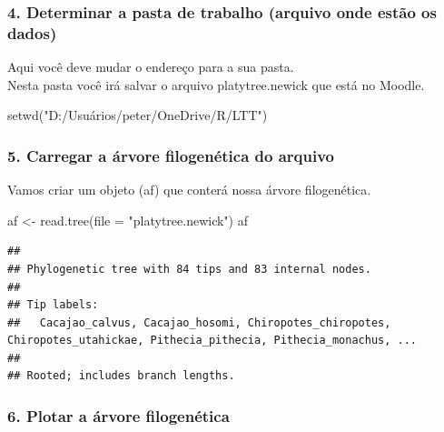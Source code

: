 \documentclass[
]{article}
\newenvironment{Shaded}{\begin{snugshade}}{\end{snugshade}}
\newcommand{\AttributeTok}[1]{\textcolor[rgb]{0.77,0.63,0.00}{#1}}
\newcommand{\FunctionTok}[1]{\textcolor[rgb]{0.00,0.00,0.00}{#1}}
\newcommand{\NormalTok}[1]{#1}
\newcommand{\OtherTok}[1]{\textcolor[rgb]{0.56,0.35,0.01}{#1}}
\newcommand{\StringTok}[1]{\textcolor[rgb]{0.31,0.60,0.02}{#1}}
\begin{document}
\hypertarget{determinar-a-pasta-de-trabalho-arquivo-onde-estuxe3o-os-dados}{%
\subsubsection{4. Determinar a pasta de trabalho (arquivo onde estão os
dados)}\label{determinar-a-pasta-de-trabalho-arquivo-onde-estuxe3o-os-dados}}

Aqui você deve mudar o endereço para a sua pasta.\\
Nesta pasta você irá salvar o arquivo platytree.newick que está no
Moodle.

\begin{Shaded}
\begin{Highlighting}[]
\FunctionTok{setwd}\NormalTok{(}\StringTok{"D:/Usuários/peter/OneDrive/R/LTT"}\NormalTok{)}
\end{Highlighting}
\end{Shaded}

\hypertarget{carregar-a-uxe1rvore-filogenuxe9tica-do-arquivo}{%
\subsubsection{5. Carregar a árvore filogenética do
arquivo}\label{carregar-a-uxe1rvore-filogenuxe9tica-do-arquivo}}

Vamos criar um objeto (af) que conterá nossa árvore filogenética.

\begin{Shaded}
\begin{Highlighting}[]
\NormalTok{af }\OtherTok{\textless{}{-}} \FunctionTok{read.tree}\NormalTok{(}\AttributeTok{file =} \StringTok{"platytree.newick"}\NormalTok{)}
\NormalTok{af}
\end{Highlighting}
\end{Shaded}

\begin{verbatim}
## 
## Phylogenetic tree with 84 tips and 83 internal nodes.
## 
## Tip labels:
##   Cacajao_calvus, Cacajao_hosomi, Chiropotes_chiropotes, Chiropotes_utahickae, Pithecia_pithecia, Pithecia_monachus, ...
## 
## Rooted; includes branch lengths.
\end{verbatim}

\hypertarget{plotar-a-uxe1rvore-filogenuxe9tica}{%
\subsubsection{6. Plotar a árvore
filogenética}\label{plotar-a-uxe1rvore-filogenuxe9tica}}
\end{document}

